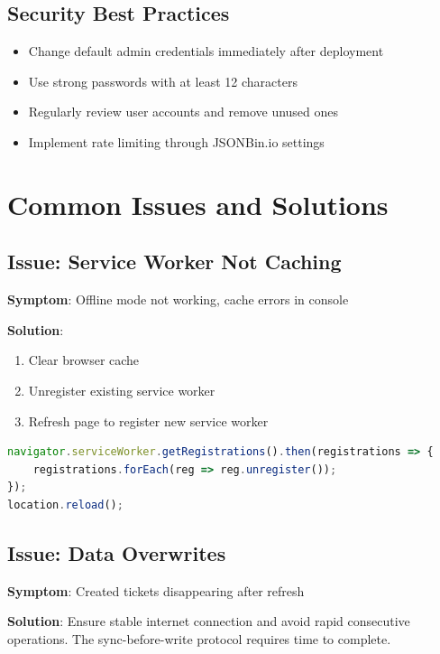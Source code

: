 \documentclass[12pt,a4paper]{report}
\begin{document}
\subsection{Security Best Practices}
\begin{itemize}
    \item Change default admin credentials immediately after deployment
    \item Use strong passwords with at least 12 characters
    \item Regularly review user accounts and remove unused ones
    \item Implement rate limiting through JSONBin.io settings
\end{itemize}

\section{Common Issues and Solutions}
\label{sec:common-issues}

\subsection{Issue: Service Worker Not Caching}
\textbf{Symptom}: Offline mode not working, cache errors in console

\textbf{Solution}: 
\begin{enumerate}
    \item Clear browser cache
    \item Unregister existing service worker
    \item Refresh page to register new service worker
\end{enumerate}

\begin{lstlisting}[language=JavaScript, caption={Clear Service Worker}, label={lst:sw-clear}]
navigator.serviceWorker.getRegistrations().then(registrations => {
    registrations.forEach(reg => reg.unregister());
});
location.reload();
\end{lstlisting}

\subsection{Issue: Data Overwrites}
\textbf{Symptom}: Created tickets disappearing after refresh

\textbf{Solution}: Ensure stable internet connection and avoid rapid consecutive operations. The sync-before-write protocol requires time to complete.
\end{document}
